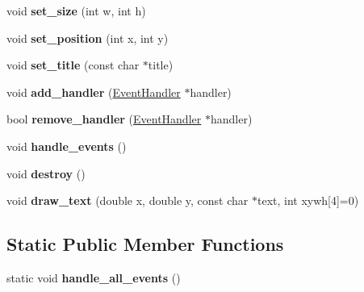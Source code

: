 \begin{DoxyCompactItemize}
void {\bfseries set\+\_\+size} (int w, int h)
\item 
\mbox{\label{classglwindow_1_1_g_l_window_aa60bf838a81fafa38120424a25a2adef}} 
void {\bfseries set\+\_\+position} (int x, int y)
\item 
\mbox{\label{classglwindow_1_1_g_l_window_ae6a1274fab8ba6831681c43964f97a87}} 
void {\bfseries set\+\_\+title} (const char $\ast$title)
\item 
\mbox{\label{classglwindow_1_1_g_l_window_a00d9e2f4d0e7d3696e32a38df005299b}} 
void {\bfseries add\+\_\+handler} (\hyperlink{structglwindow_1_1_event_handler}{Event\+Handler} $\ast$handler)
\item 
\mbox{\label{classglwindow_1_1_g_l_window_a13a72e01ab5ee8926dc401f0231d32d3}} 
bool {\bfseries remove\+\_\+handler} (\hyperlink{structglwindow_1_1_event_handler}{Event\+Handler} $\ast$handler)
\item 
\mbox{\label{classglwindow_1_1_g_l_window_adc3ad89ccb14a800919947c55f4f8f81}} 
void {\bfseries handle\+\_\+events} ()
\item 
\mbox{\label{classglwindow_1_1_g_l_window_a9a6d66c63bfc4796fd10927da3e3114f}} 
void {\bfseries destroy} ()
\item 
\mbox{\label{classglwindow_1_1_g_l_window_a1a8c3e1e280e4c5403a478f5229a3320}} 
void {\bfseries draw\+\_\+text} (double x, double y, const char $\ast$text, int xywh\mbox{[}4\mbox{]}=0)
\end{DoxyCompactItemize}
\subsection*{Static Public Member Functions}
\begin{DoxyCompactItemize}
\item 
\mbox{\label{classglwindow_1_1_g_l_window_a00458901c7cca772aba1e37c7ae11da5}} 
static void {\bfseries handle\+\_\+all\+\_\+events} ()
\end{DoxyCompactItemize}
